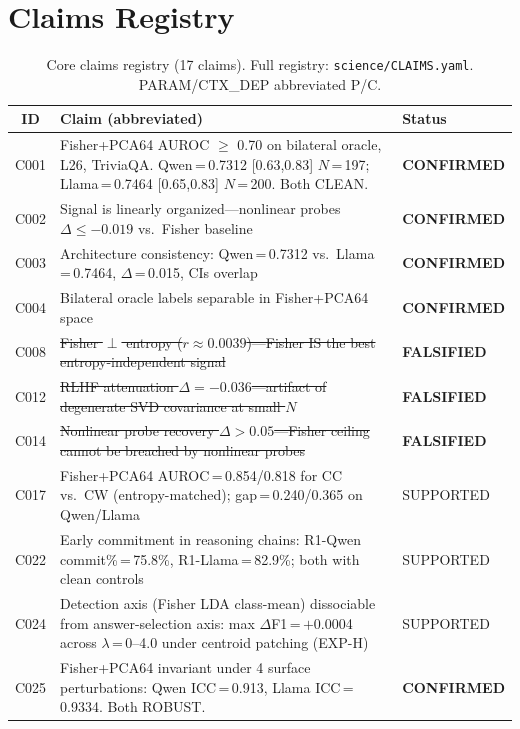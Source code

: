 \documentclass[11pt]{article}
\begin{document}
\appendix

\section{Claims Registry}
\label{app:claims}

\begin{table}[h!]
\centering
\small
\caption{Core claims registry (17 claims). Full registry: \texttt{science/CLAIMS.yaml}. PARAM/CTX\_DEP abbreviated P/C.}
\begin{tabular}{cL{8.5cm}l}
\toprule
ID & Claim (abbreviated) & Status \\
\midrule
C001 & Fisher+PCA64 AUROC $\geq$ 0.70 on bilateral oracle, L26, TriviaQA. Qwen\,=\,0.7312 [0.63,0.83] $N$\,=\,197; Llama\,=\,0.7464 [0.65,0.83] $N$\,=\,200. Both CLEAN. & \textbf{CONFIRMED} \\
C002 & Signal is linearly organized---nonlinear probes $\Delta \leq -0.019$ vs.\ Fisher baseline & \textbf{CONFIRMED} \\
C003 & Architecture consistency: Qwen\,=\,0.7312 vs.\ Llama\,=\,0.7464, $\Delta$\,=\,0.015, CIs overlap & \textbf{CONFIRMED} \\
C004 & Bilateral oracle labels separable in Fisher+PCA64 space & \textbf{CONFIRMED} \\
C008 & \sout{Fisher $\perp$ entropy ($r \approx 0.0039$)---Fisher IS the best entropy-independent signal} & \textbf{FALSIFIED} \\
C012 & \sout{RLHF attenuation $\Delta = -0.036$---artifact of degenerate SVD covariance at small $N$} & \textbf{FALSIFIED} \\
C014 & \sout{Nonlinear probe recovery $\Delta > 0.05$---Fisher ceiling cannot be breached by nonlinear probes} & \textbf{FALSIFIED} \\
C017 & Fisher+PCA64 AUROC\,=\,0.854/0.818 for CC vs.\ CW (entropy-matched); gap\,=\,0.240/0.365 on Qwen/Llama & SUPPORTED \\
C022 & Early commitment in reasoning chains: R1-Qwen commit\%\,=\,75.8\%, R1-Llama\,=\,82.9\%; both with clean controls & SUPPORTED \\
C024 & Detection axis (Fisher LDA class-mean) dissociable from answer-selection axis: max $\Delta$F1\,=\,$+$0.0004 across $\lambda$\,=\,0--4.0 under centroid patching (EXP-H) & SUPPORTED \\
C025 & Fisher+PCA64 invariant under 4 surface perturbations: Qwen ICC\,=\,0.913, Llama ICC\,=\,0.9334. Both ROBUST. & \textbf{CONFIRMED} \\

\end{tabular}
\end{table}
\end{document}
